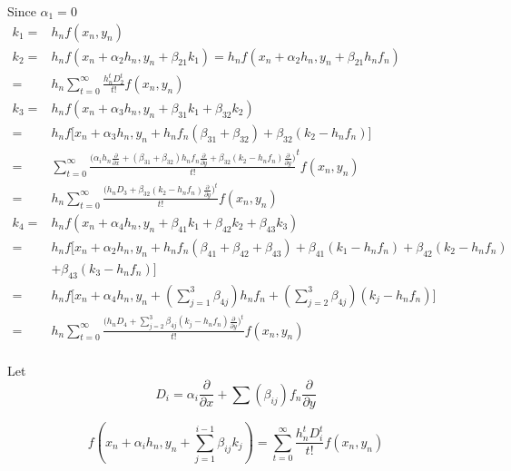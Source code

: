 \documentclass[12 pt]{article}
\begin{document}
{
\large
Since $\alpha_{1} = 0$ 
\begin{equation}
\begin{split}
k_{1} =& h_{n}f(x_{n},y_{n})\\
k_{2} =& h_{n}f(x_{n}+\alpha_{2}h_{n},y_{n}+\beta_{21}k_{1})=h_{n}f(x_{n}+\alpha_{2}h_{n},y_{n}+\beta_{21}h_{n}f_{n})\\
      =& h_{n} \sum_{t=0}^{\infty}\frac{h_{n}^{t}D_{2}^{t}}{t!}f(x_{n},y_{n})\\
k_{3} = & h_{n}f(x_{n}+\alpha_{3}h_{n},y_{n}+\beta_{31}k_{1}+\beta_{32}k_{2})\\
	  =	& h_{n}f\bigg[x_{n}+\alpha_{3}h_{n},y_{n}+h_{n}f_{n}(\beta_{31}+\beta_{32})+\beta_{32}(k_{2}-h_{n}f_{n})\bigg]\\
	  = & \sum_{t=0}^{\infty}\frac{\bigg(\alpha_{i}h_{n}\frac{\partial}{\partial x} + (\beta_{31}+\beta_{32})h_{n}f_{n}\frac{\partial}{\partial y} + \beta_{32}(k_{2}-h_{n}f_{n})\frac{\partial}{\partial y}\bigg)}{t!}^{t}f(x_{n},y_{n})\\
	  =& h_{n}\sum_{t=0}^{\infty}\frac{\bigg(h_{n}D_{3}+\beta_{32}(k_{2}-h_{n}f_{n})\frac{\partial}{\partial y}\bigg)^{t}}{t!}f(x_{n},y_{n})\\
k_{4} =& h_{n}f(x_{n}+\alpha_{4}h_{n},y_{n}+\beta_{41}k_{1}+\beta_{42}k_{2}+\beta_{43}k_{3})\\
	  =& h_{n}f\bigg[x_{n}+\alpha_{2}h_{n},y_{n}+h_{n}f_{n}(\beta_{41}+\beta_{42}+\beta_{43})+\beta_{41}(k_{1}-h_{n}f_{n})+\beta_{42}(k_{2}-h_{n}f_{n})\\
	  	  & +\beta_{43}(k_{3}-h_{n}f_{n})\bigg]\\
	  =& h_{n}f\bigg[x_{n}+\alpha_{4}h_{n}, y_{n}+(\sum_{j=1}^{3}\beta_{4j})h_{n}f_{n} + (\sum_{j=2}^{3}\beta_{4j})(k_{j}-h_{n}f_{n})\bigg]\\
	  =& h_{n}\sum_{t=0}^{\infty}\frac{\bigg(h_{n}D_{4}+\sum_{j=2}^{3}\beta_{4j}(k_{j}-h_{n}f_{n})\frac{\partial}{\partial y}\bigg)^{t}}{t!}f(x_{n},y_{n}) \\
\end{split}
\end{equation}
}

Let {\large $$D_{i} = \alpha_{i}\frac{\partial}{\partial x} + \sum (\beta_{ij})f_{n}\frac{\partial}{\partial y}$$}

{
	\large
	$$f(x_{n}+\alpha_{i}h_{n}, y_{n}+\sum_{j=1}^{i-1}\beta_{ij}k_{j}) = \sum_{t=0}^{\infty}\frac{h_{n}^{t}D^{t}_{i}}{t!}f(x_{n},y_{n})$$
}
\end{document}
